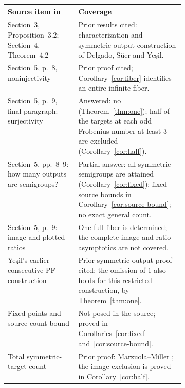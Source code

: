 \documentclass[11pt]{article}
\begin{document}
\smallskip
\begingroup\small
\noindent\begin{tabularx}{\linewidth}{@{}p{0.40\linewidth}X@{}}
\toprule
Source item in \cite{DSY} & Coverage \\
\midrule
Section~3, Proposition~3.2; Section~4, Theorem~4.2 & Prior results cited:
characterization and symmetric-output construction of Delgado, S\"uer and Ye\c{s}il. \\
Section~5, p.~8, noninjectivity & Prior proof cited; Corollary~\ref{cor:fiber}
identifies an entire infinite fiber. \\
Section~5, p.~9, final paragraph: surjectivity & Answered: no
(Theorem~\ref{thm:one}); half of the targets at each odd Frobenius number
at least $3$ are excluded (Corollary~\ref{cor:half}). \\
Section~5, pp.~8--9: how many outputs are semigroups? & Partial answer:
all symmetric semigroups are attained (Corollary~\ref{cor:fixed});
fixed-source bounds in Corollary~\ref{cor:source-bound}; no exact general count. \\
Section~5, p.~9: image and plotted ratios & One full fiber is determined;
the complete image and ratio asymptotics are not covered. \\
Ye\c{s}il's earlier consecutive-PF construction \cite[Lemma~5.7]{Y} &
Prior symmetric-output proof cited; the omission of $1$ also holds for this
restricted construction, by Theorem~\ref{thm:one}. \\
Fixed points and source-count bound & Not posed in the source;
proved in Corollaries~\ref{cor:fixed} and~\ref{cor:source-bound}. \\
Total symmetric-target count & Prior proof: Marzuola--Miller
\cite[p.~12]{MM}; the image exclusion is proved in Corollary~\ref{cor:half}. \\
\bottomrule
\end{tabularx}
\endgroup
\end{document}
